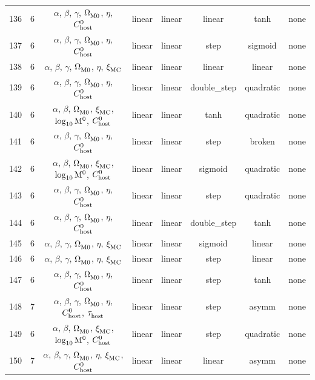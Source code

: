 \begin{longtable}{c c c c c c c c}
    136 & 6 & $\alpha$, $\beta$, $\gamma$, $\Omega_{\rm M0}^{}$, $\eta$, $C_{\rm host}^{0}$ & linear & linear & linear & tanh & none \\
    137 & 6 & $\alpha$, $\beta$, $\gamma$, $\Omega_{\rm M0}^{}$, $\eta$, $C_{\rm host}^{0}$ & linear & linear & step & sigmoid & none \\
    138 & 6 & $\alpha$, $\beta$, $\gamma$, $\Omega_{\rm M0}^{}$, $\eta$, $\xi_{\rm MC}^{}$ & linear & linear & linear & linear & none \\
    139 & 6 & $\alpha$, $\beta$, $\gamma$, $\Omega_{\rm M0}^{}$, $\eta$, $C_{\rm host}^{0}$ & linear & linear & double\_step & quadratic & none \\
    140 & 6 & $\alpha$, $\beta$, $\Omega_{\rm M0}^{}$, $\xi_{\rm MC}^{}$, $\log_{10}^{}{\rm M}^0$, $C_{\rm host}^{0}$ & linear & linear & tanh & quadratic & none \\
    141 & 6 & $\alpha$, $\beta$, $\gamma$, $\Omega_{\rm M0}^{}$, $\eta$, $C_{\rm host}^{0}$ & linear & linear & step & broken & none \\
    142 & 6 & $\alpha$, $\beta$, $\Omega_{\rm M0}^{}$, $\xi_{\rm MC}^{}$, $\log_{10}^{}{\rm M}^0$, $C_{\rm host}^{0}$ & linear & linear & sigmoid & quadratic & none \\
    143 & 6 & $\alpha$, $\beta$, $\gamma$, $\Omega_{\rm M0}^{}$, $\eta$, $C_{\rm host}^{0}$ & linear & linear & step & quadratic & none \\
    144 & 6 & $\alpha$, $\beta$, $\gamma$, $\Omega_{\rm M0}^{}$, $\eta$, $C_{\rm host}^{0}$ & linear & linear & double\_step & tanh & none \\
    145 & 6 & $\alpha$, $\beta$, $\gamma$, $\Omega_{\rm M0}^{}$, $\eta$, $\xi_{\rm MC}^{}$ & linear & linear & sigmoid & linear & none \\
    146 & 6 & $\alpha$, $\beta$, $\gamma$, $\Omega_{\rm M0}^{}$, $\eta$, $\xi_{\rm MC}^{}$ & linear & linear & step & linear & none \\
    147 & 6 & $\alpha$, $\beta$, $\gamma$, $\Omega_{\rm M0}^{}$, $\eta$, $C_{\rm host}^{0}$ & linear & linear & step & tanh & none \\
    148 & 7 & $\alpha$, $\beta$, $\gamma$, $\Omega_{\rm M0}^{}$, $\eta$, $C_{\rm host}^{0}$, $\tau_{\rm host}^{}$ & linear & linear & step & asymm & none \\
    149 & 6 & $\alpha$, $\beta$, $\Omega_{\rm M0}^{}$, $\xi_{\rm MC}^{}$, $\log_{10}^{}{\rm M}^0$, $C_{\rm host}^{0}$ & linear & linear & step & quadratic & none \\
    150 & 7 & $\alpha$, $\beta$, $\gamma$, $\Omega_{\rm M0}^{}$, $\eta$, $\xi_{\rm MC}^{}$, $C_{\rm host}^{0}$ & linear & linear & linear & asymm & none \\

\end{longtable}
